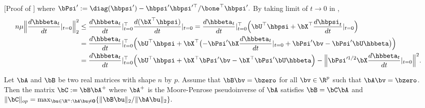 \documentclass{colt2022} %
\renewenvironment{proof}[1][]
{
    \begin{newproof}
    \ifthenelse{\equal{#1}{}}{ }{\textbf{(#1) }}%
}{
    \end{newproof}
}
\numberwithin{equation}{section}
\begin{document}
\begin{proof} [Proof of ]
    where 
    $ 
        \bPsi' := \diag(\hbpsi') - \hbpsi' \hbpsi'^{\top} / \bone^{\top} \hbpsi'.
    $
    By taking limit of $t \to 0$ in ,
    \begin{align*}
        n \mu 
        \Bigl\| 
        \frac{
            d \hbbeta_{t}
        }{
            d t
        }|_{t=0}
        \Bigr\|_{2}^{2}
    &\leq 
        \frac{ d \hbbeta_{t} }{ d t }|_{t=0} ^{\top}
        \frac{ d (\bX^{\top} \hbpsi) }{ d t  }|_{t = 0}
        =
        \frac{ d \hbbeta_{t} }{ d t }|_{t=0} ^{\top}
        \Bigl( \bU^{\top} \hbpsi + \bX^{\top} \frac{ d \hbpsi_{t} }{ d t }|_{t = 0} \Bigr)
    \\
        &=
        \frac{ d \hbbeta_{t} }{ d t }|_{t=0} ^{\top}
        \Bigl( \bU^{\top} \hbpsi + 
            \bX^{\top} 
            \bigl(
                - \bPsi' \bX \frac{ d \hbbeta_{t} }{ d t }|_{t = 0}
                + \bPsi' \bv
                - \bPsi' \bU \hbbeta
            \bigr)
        \Bigr)
    \\  
        &=
        \frac{ d \hbbeta_{t} }{ d t }|_{t=0} ^{\top}
        \Bigl( 
            \bU^{\top} \hbpsi 
            + \bX^{\top} \bPsi' \bv
            - \bX^{\top} \bPsi' \bU \hbbeta
        \Bigr)
        - 
        \Bigl\| \bPsi'^{1/2} \bX \frac{ d \hbbeta_{t} }{ d t }|_{t=0}\Bigr\|^{2}
    .
    \end{align*}

    
\end{proof}

    
\begin{proposition} 
    \label{prop:6890}
    Let $\bA$ and $\bB$ be two real matrices with shape $n$ by $p$.
    Assume that $\bB \bv = \bzero$ for all $\bv\in\R^p$ such that $\bA \bv= \bzero$.
    Then the matrix $\bC := \bB \bA^{+}$ 
    where $\bA^{+}$ is the Moore-Penrose pseudoinverse of $\bA$
    satisfies 
    $ 
        \bB = \bC \bA
    $
    and 
    $ 
        \| \bC \|_{op} = \max_{\bu \in \R^{n}:\bA\bu\ne \mathbf0} \{ \| \bB \bu \|_{2} / \| \bA \bu \|_{2} \}.
    $
\end{proposition}
\end{document}
